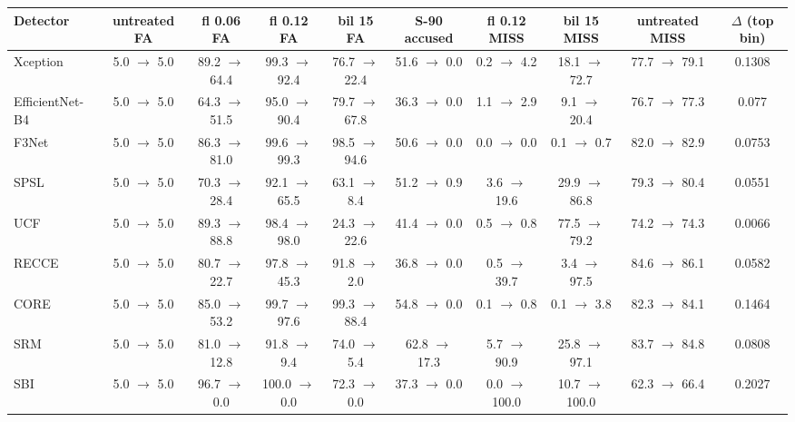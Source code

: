 \begin{tabular}{@{}l ccccc ccc c@{}}
\toprule
Detector & untreated FA & fl 0.06 FA & fl 0.12 FA & bil 15 FA & S-90 accused & fl 0.12 MISS & bil 15 MISS & untreated MISS & $\Delta$ (top bin) \\
\midrule
Xception & 5.0 $\rightarrow$ 5.0 & 89.2 $\rightarrow$ 64.4 & 99.3 $\rightarrow$ 92.4 & 76.7 $\rightarrow$ 22.4 & 51.6 $\rightarrow$ 0.0 & 0.2 $\rightarrow$ 4.2 & 18.1 $\rightarrow$ 72.7 & 77.7 $\rightarrow$ 79.1 & 0.1308 \\
EfficientNet-B4 & 5.0 $\rightarrow$ 5.0 & 64.3 $\rightarrow$ 51.5 & 95.0 $\rightarrow$ 90.4 & 79.7 $\rightarrow$ 67.8 & 36.3 $\rightarrow$ 0.0 & 1.1 $\rightarrow$ 2.9 & 9.1 $\rightarrow$ 20.4 & 76.7 $\rightarrow$ 77.3 & 0.077 \\
F3Net & 5.0 $\rightarrow$ 5.0 & 86.3 $\rightarrow$ 81.0 & 99.6 $\rightarrow$ 99.3 & 98.5 $\rightarrow$ 94.6 & 50.6 $\rightarrow$ 0.0 & 0.0 $\rightarrow$ 0.0 & 0.1 $\rightarrow$ 0.7 & 82.0 $\rightarrow$ 82.9 & 0.0753 \\
SPSL & 5.0 $\rightarrow$ 5.0 & 70.3 $\rightarrow$ 28.4 & 92.1 $\rightarrow$ 65.5 & 63.1 $\rightarrow$ 8.4 & 51.2 $\rightarrow$ 0.9 & 3.6 $\rightarrow$ 19.6 & 29.9 $\rightarrow$ 86.8 & 79.3 $\rightarrow$ 80.4 & 0.0551 \\
UCF & 5.0 $\rightarrow$ 5.0 & 89.3 $\rightarrow$ 88.8 & 98.4 $\rightarrow$ 98.0 & 24.3 $\rightarrow$ 22.6 & 41.4 $\rightarrow$ 0.0 & 0.5 $\rightarrow$ 0.8 & 77.5 $\rightarrow$ 79.2 & 74.2 $\rightarrow$ 74.3 & 0.0066 \\
RECCE & 5.0 $\rightarrow$ 5.0 & 80.7 $\rightarrow$ 22.7 & 97.8 $\rightarrow$ 45.3 & 91.8 $\rightarrow$ 2.0 & 36.8 $\rightarrow$ 0.0 & 0.5 $\rightarrow$ 39.7 & 3.4 $\rightarrow$ 97.5 & 84.6 $\rightarrow$ 86.1 & 0.0582 \\
CORE & 5.0 $\rightarrow$ 5.0 & 85.0 $\rightarrow$ 53.2 & 99.7 $\rightarrow$ 97.6 & 99.3 $\rightarrow$ 88.4 & 54.8 $\rightarrow$ 0.0 & 0.1 $\rightarrow$ 0.8 & 0.1 $\rightarrow$ 3.8 & 82.3 $\rightarrow$ 84.1 & 0.1464 \\
SRM & 5.0 $\rightarrow$ 5.0 & 81.0 $\rightarrow$ 12.8 & 91.8 $\rightarrow$ 9.4 & 74.0 $\rightarrow$ 5.4 & 62.8 $\rightarrow$ 17.3 & 5.7 $\rightarrow$ 90.9 & 25.8 $\rightarrow$ 97.1 & 83.7 $\rightarrow$ 84.8 & 0.0808 \\
SBI & 5.0 $\rightarrow$ 5.0 & 96.7 $\rightarrow$ 0.0 & 100.0 $\rightarrow$ 0.0 & 72.3 $\rightarrow$ 0.0 & 37.3 $\rightarrow$ 0.0 & 0.0 $\rightarrow$ 100.0 & 10.7 $\rightarrow$ 100.0 & 62.3 $\rightarrow$ 66.4 & 0.2027 \\

\end{tabular}
